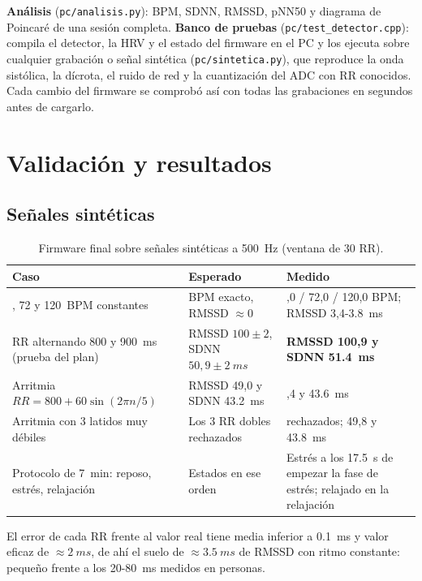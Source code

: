 \documentclass[11pt,a4paper]{article}
\begin{document}
\textbf{Análisis} (\texttt{pc/analisis.py}): BPM, SDNN, RMSSD, pNN50 y diagrama de Poincaré de
una sesión completa. \textbf{Banco de pruebas} (\texttt{pc/test\_detector.cpp}): compila el
detector, la HRV y el estado del firmware en el PC y los ejecuta sobre cualquier grabación o
señal sintética (\texttt{pc/sintetica.py}), que reproduce la onda sistólica, la dícrota, el
ruido de red y la cuantización del ADC con RR conocidos. Cada cambio del firmware se
comprobó así con todas las grabaciones en segundos antes de cargarlo.

\section{Validación y resultados}

\subsection{Señales sintéticas}

\begin{table}[H]
\centering\small
\caption{Firmware final sobre señales sintéticas a \qty{500}{Hz} (ventana de 30 RR).}
\label{tab:sintetica}
\begin{tabularx}{\textwidth}{>{\raggedright\arraybackslash}X>{\raggedright\arraybackslash}X>{\raggedright\arraybackslash}X}
\toprule
Caso & Esperado & Medido \\
\midrule
60, 72 y \qty{120}{BPM} constantes & BPM exacto, RMSSD $\approx 0$ & 60,0 / 72,0 / 120,0 BPM; RMSSD 3,4-\qty{3.8}{ms} \\
RR alternando 800 y \qty{900}{ms} (prueba del plan) & RMSSD $100 \pm 2$, SDNN $50{,}9 \pm \qty{2}{ms}$ & \textbf{RMSSD 100,9 y SDNN \qty{51.4}{ms}} \\
Arritmia $RR = 800 + 60\sin(2\pi n/5)$ & RMSSD 49,0 y SDNN \qty{43.2}{ms} & 49,4 y \qty{43.6}{ms} \\
Arritmia con 3 latidos muy débiles & Los 3 RR dobles rechazados & 3 rechazados; 49,8 y \qty{43.8}{ms} \\
Protocolo de \qty{7}{min}: reposo, estrés, relajación & Estados en ese orden & Estrés a los \qty{17.5}{s} de empezar la fase de estrés; relajado en la relajación \\
\bottomrule
\end{tabularx}
\end{table}

El error de cada RR frente al valor real tiene media inferior a \qty{0.1}{ms} y valor eficaz
de $\approx\qty{2}{ms}$, de ahí el suelo de $\approx\qty{3.5}{ms}$ de RMSSD con ritmo
constante: pequeño frente a los 20-\qty{80}{ms} medidos en personas.
\end{document}
